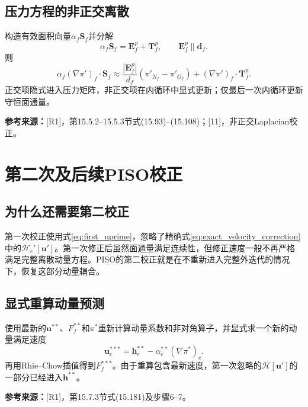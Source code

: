 \documentclass[UTF8,12pt,a4paper]{ctexart}
\numberwithin{equation}{section}
\newcommand{\Jasak}{\textnormal{[11]}}
\newcommand{\Rone}{\textnormal{[R1]}}
\newcommand{\source}[1]{\par\smallskip\noindent\colorbox{sourcebg}{%
  \parbox{0.955\linewidth}{\footnotesize\color{sourcegray}\textbf{参考来源：}#1}}\par\smallskip}
\begin{document}
\subsection{压力方程的非正交离散}
构造有效面积向量$\alpha_f\bm S_f$并分解
\begin{equation}
  \alpha_f\bm S_f=\bm E_f^p+\bm T_f^p,\qquad
  \bm E_f^p\parallel\bm d_f.
\end{equation}
则
\begin{equation}
  \alpha_f(\nabla\pi')_f\cdot\bm S_f
  \approx\frac{|\bm E_f^p|}{d_f}
  (\pi'_{N_f}-\pi'_{O_f})
  +(\nabla\pi')_f\cdot\bm T_f^p.
  \label{eq:pprime_nonorth}
\end{equation}
正交项隐式进入压力矩阵，非正交项在内循环中显式更新；仅最后一次内循环更新守恒面通量。
\source{\Rone，第15.5.2--15.5.3节式(15.93)--(15.108)；\Jasak，非正交Laplacian校正。}

\section{第二次及后续PISO校正}
\subsection{为什么还需要第二校正}
第一次校正使用式\eqref{eq:first_uprime}，忽略了精确式\eqref{eq:exact_velocity_correction}中的$\mathcal H_c'[\bm u']$。第一次修正后虽然面通量满足连续性，但修正速度一般不再严格满足完整离散动量方程。PISO的第二校正就是在不重新进入完整外迭代的情况下，恢复这部分动量耦合。

\subsection{显式重算动量预测}
使用最新的$\bm u^{**}$、$F_f^{**}$和$\pi^*$重新计算动量系数和非对角算子，并显式求一个新的动量满足速度
\begin{equation}
  \boxed{\bm u_c^{***}
  =\bm h_c^{**}-\alpha_c^{**}(\nabla\pi^*)_c.}
  \label{eq:second_predictor}
\end{equation}
再用Rhie--Chow插值得到$F_f^{***}$。由于重算包含最新速度，第一次忽略的$\mathcal H[\bm u']$的一部分已经进入$\bm h^{**}$。
\source{\Rone，第15.7.3节式(15.181)及步骤6--7。}
\end{document}
